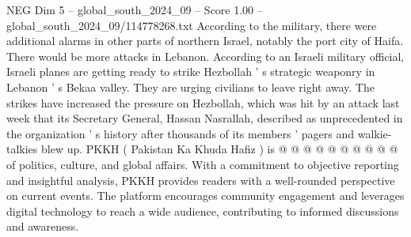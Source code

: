 \begin{textsample}{NEG Dim 5 – global\_south\_2024\_09 – Score 1.00 – global\_south\_2024\_09/114778268.txt}
According to the military, there were additional alarms in other parts of northern Israel, notably the port city of Haifa.
There would be more attacks in Lebanon.
According to an Israeli military official, Israeli planes are getting ready to strike Hezbollah ' s strategic weaponry in Lebanon ' s Bekaa valley.
They are urging civilians to leave right away.
The strikes have increased the pressure on Hezbollah, which was hit by an attack last week that its Secretary General, Hassan Nasrallah, described as unprecedented in the organization ' s history after thousands of its members ' pagers and walkie-talkies blew up.
PKKH ( Pakistan Ka Khuda Hafiz ) is @ @ @ @ @ @ @ @ @ @ of politics, culture, and global affairs.
With a commitment to objective reporting and insightful analysis, PKKH provides readers with a well-rounded perspective on current events.
The platform encourages community engagement and leverages digital technology to reach a wide audience, contributing to informed discussions and awareness.

\end{textsample}

